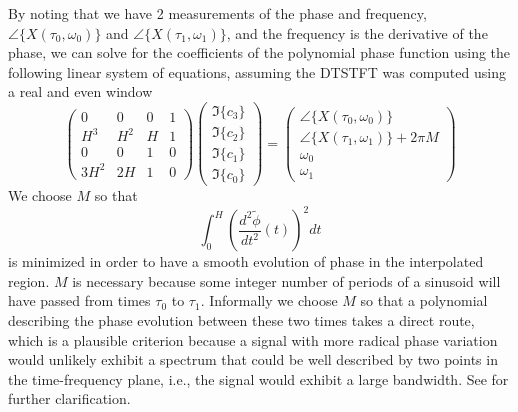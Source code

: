 By noting that we have 2 measurements of the phase and frequency,
$\angle\{X(\tau_0,\omega_0)\}$ and $\angle\{X(\tau_1,\omega_1)\}$, and the frequency
is the derivative of the phase, we can solve for the coefficients of the
polynomial phase function using the following linear system of equations,
assuming the DTSTFT was computed using a real and even window
\begin{equation}
    \begin{pmatrix}
        0   & 0     & 0 & 1 \\
        H^3 & H^2   & H & 1 \\
        0   & 0     & 1 & 0 \\
        3 H^2 & 2 H & 1 & 0
    \end{pmatrix}
    \begin{pmatrix}
        \Im\{c_3\} \\
        \Im\{c_2\} \\
        \Im\{c_1\} \\
        \Im\{c_0\}
    \end{pmatrix}
    =
    \begin{pmatrix}
        \angle\{X(\tau_0,\omega_0)\} \\
        \angle\{X(\tau_1,\omega_1)\} + 2 \pi M \\
        \omega_0 \\
        \omega_1        
    \end{pmatrix}
\end{equation}
We choose $M$ so that
\begin{equation}
    \label{eq:minfmmq}
    \int_{0}^{H}(\frac{d^{2}\tilde{\phi}}{dt^2}(t))^{2}dt
\end{equation}
is minimized in order to have a smooth evolution of phase in the interpolated
region. $M$ is necessary because some integer number of periods of a sinusoid
will have passed from times $\tau_{0}$ to $\tau_{1}$. Informally we choose $M$
so that a polynomial describing the phase evolution between these two times
takes a direct route, which is a plausible criterion because a signal with more
radical phase variation would unlikely exhibit a spectrum that could be well
described by two points in the time-frequency plane, i.e., the signal
would exhibit a large bandwidth. See \cite[p.~751]{mcaulay1986speech} for
further clarification.

